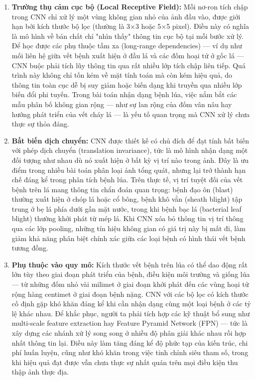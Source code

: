 \begin{enumerate}[leftmargin=1.5cm]
    \item \textbf{Trường thụ cảm cục bộ (Local Receptive Field):} Mỗi nơ-ron tích chập trong CNN chỉ xử lý một vùng không gian nhỏ của ảnh đầu vào, được giới hạn bởi kích thước bộ lọc (thường là 3×3 hoặc 5×5 pixel). Điều này có nghĩa là mô hình về bản chất chỉ "nhìn thấy" thông tin cục bộ tại mỗi bước xử lý. Để học được các phụ thuộc tầm xa (long-range dependencies) — ví dụ như mối liên hệ giữa vết bệnh xuất hiện ở đầu lá và các đốm hoại tử ở gốc lá — CNN buộc phải tích lũy thông tin qua rất nhiều lớp tích chập liên tiếp. Quá trình này không chỉ tốn kém về mặt tính toán mà còn kém hiệu quả, do thông tin toàn cục dễ bị suy giảm hoặc biến dạng khi truyền qua nhiều lớp biến đổi phi tuyến. Trong bài toán nhận dạng bệnh lúa, việc nắm bắt các mẫu phân bố không gian rộng — như sự lan rộng của đốm vân nâu hay hướng phát triển của vết cháy lá — là yếu tố quan trọng mà CNN xử lý chưa thực sự thỏa đáng.
    \item \textbf{Bất biến dịch chuyển:} CNN được thiết kế có chủ đích để đạt tính bất biến với phép dịch chuyển (translation invariance), tức là mô hình nhận dạng một đối tượng như nhau dù nó xuất hiện ở bất kỳ vị trí nào trong ảnh. Đây là ưu điểm trong nhiều bài toán phân loại ảnh tổng quát, nhưng lại trở thành hạn chế đáng kể trong phân tích bệnh lúa. Trên thực tế, vị trí tuyệt đối của vết bệnh trên lá mang thông tin chẩn đoán quan trọng: bệnh đạo ôn (blast) thường xuất hiện ở chóp lá hoặc cổ bông, bệnh khô vằn (sheath blight) tập trung ở bẹ lá phía dưới gần mặt nước, trong khi bệnh bạc lá (bacterial leaf blight) thường khởi phát từ mép lá. Khi CNN xóa bỏ thông tin vị trí thông qua các lớp pooling, những tín hiệu không gian có giá trị này bị mất đi, làm giảm khả năng phân biệt chính xác giữa các loại bệnh có hình thái vết bệnh tương đồng.
    \item \textbf{Phụ thuộc vào quy mô:} Kích thước vết bệnh trên lúa có thể dao động rất lớn tùy theo giai đoạn phát triển của bệnh, điều kiện môi trường và giống lúa — từ những đốm nhỏ vài milimet ở giai đoạn khởi phát đến các vùng hoại tử rộng hàng centimet ở giai đoạn bệnh nặng. CNN với các bộ lọc có kích thước cố định gặp khó khăn đáng kể khi cần nhận dạng cùng một loại bệnh ở các tỷ lệ khác nhau. Để khắc phục, người ta phải tích hợp các kỹ thuật bổ sung như multi-scale feature extraction hay Feature Pyramid Network (FPN) — tức là xây dựng các nhánh xử lý song song ở nhiều độ phân giải khác nhau rồi hợp nhất thông tin lại. Điều này làm tăng đáng kể độ phức tạp của kiến trúc, chi phí huấn luyện, cũng như khó khăn trong việc tinh chỉnh siêu tham số, trong khi hiệu quả đạt được vẫn chưa thực sự nhất quán trên mọi điều kiện thu thập ảnh thực địa.

\end{enumerate}
